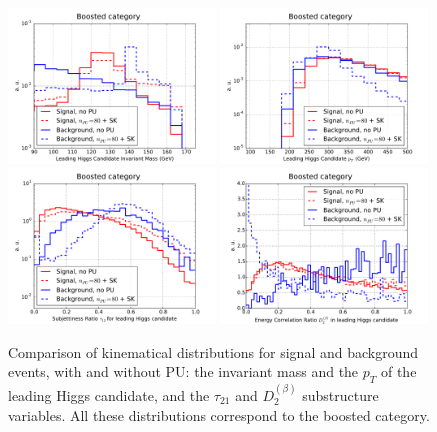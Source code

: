 \begin{figure}[t]
  \begin{center}
    \vspace{-1cm}
  \includegraphics[width=0.49\textwidth]{plots/m_h0_bst_comp_back.pdf}
  \includegraphics[width=0.49\textwidth]{plots/pt_h0_bst_comp_back.pdf}
   \includegraphics[width=0.49\textwidth]{plots/tau21_h1_bst_comp_back.pdf}
  \includegraphics[width=0.49\textwidth]{plots/D2_h0_bst_comp_back.pdf}
   \caption{\small
     Comparison of kinematical distributions for signal and background events,
     with and without PU: the invariant mass and the $p_T$ of the leading
     Higgs candidate, and the $\tau_{21}$ and $D^{(\beta)}_2$ substructure variables.
     All these distributions correspond to the boosted category.
}
\label{fig:signal-vs-back-boosted}
\end{center}
\end{figure}



